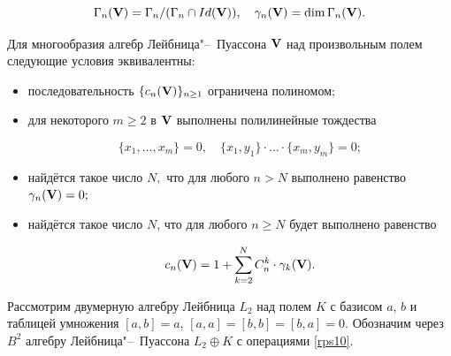 $$

\Gamma_n({\bf V}) = \Gamma_n/(\Gamma_n \cap \mathop{Id}({\bf V})), \quad \gamma_n({\bf V}) = \mathop{\rm dim} \Gamma_n({\bf V}).

$$



\smallskip



\begin{theorem}

Для многообразия алгебр Лейбница"--~Пуассона ${\bf V}$ над произвольным полем следующие условия эквивалентны\/$:$



\begin{itemize}



\item[\rm (i)] последовательность $\{c_n({\bf V})\}_{n \geq 1}$ ограничена полиномом\/$;$



\item[\rm (ii)] для некоторого $m \geq 2$ в ${\bf V}$ выполнены полилинейные тождества

$$

 \{x_1, \dots ,x_m\} = 0,\quad \{x_1,y_1\}\cdot \dots \cdot \{x_m,y_m\} = 0;

$$



\item[\rm (iii)] найдётся такое число $N,$ что для любого $n > N$ выполнено равенство $\gamma_n({\bf V}) = 0;$



\item[\rm (iv)] найдётся такое число $N$, что для любого $n \geq N$ будет выполнено равенство

$$

 c_n({\bf V}) = 1+\sum_{k=2}^NC_n^k \cdot \gamma_k({\bf V}).

$$



\end{itemize}



\end{theorem}



\smallskip



Рассмотрим двумерную алгебру Лейбница $L_2$ над полем $K$ с базисом $a$, $b$ и таблицей умножения $[a,b]=a$, $[a,a]=[b,b]=[b,a]=0$. Обозначим через $B^2$ алгебру Лейбница"--~Пуассона $L_2 \oplus K$ с операциями \eqref{rps10}.





